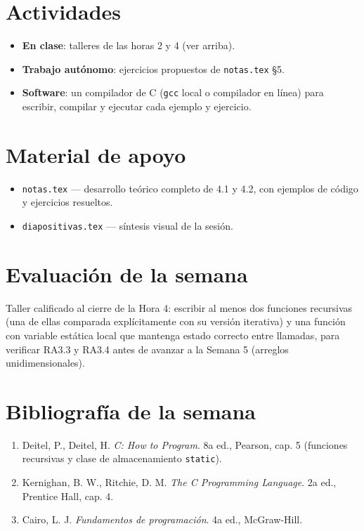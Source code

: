 \documentclass[11pt,letterpaper]{article}
\begin{document}
\section{Actividades}

\begin{itemize}[leftmargin=1.2cm]
  \item \textbf{En clase}: talleres de las horas 2 y 4 (ver arriba).
  \item \textbf{Trabajo autónomo}: ejercicios propuestos de \texttt{notas.tex} §5.
  \item \textbf{Software}: un compilador de C (\texttt{gcc} local o compilador en línea) para
        escribir, compilar y ejecutar cada ejemplo y ejercicio.
\end{itemize}

\section{Material de apoyo}

\begin{itemize}[leftmargin=1.2cm]
  \item \texttt{notas.tex} --- desarrollo teórico completo de 4.1 y 4.2, con ejemplos de código y
        ejercicios resueltos.
  \item \texttt{diapositivas.tex} --- síntesis visual de la sesión.
\end{itemize}

\section{Evaluación de la semana}

Taller calificado al cierre de la Hora 4: escribir al menos dos funciones recursivas (una de ellas
comparada explícitamente con su versión iterativa) y una función con variable estática local que
mantenga estado correcto entre llamadas, para verificar RA3.3 y RA3.4 antes de avanzar a la Semana
5 (arreglos unidimensionales).

\section{Bibliografía de la semana}

\begin{enumerate}[leftmargin=1.2cm]
  \item Deitel, P., Deitel, H. \emph{C: How to Program}. 8a ed., Pearson, cap. 5 (funciones
        recursivas y clase de almacenamiento \texttt{static}).
  \item Kernighan, B. W., Ritchie, D. M. \emph{The C Programming Language}. 2a ed., Prentice Hall,
        cap. 4.
  \item Cairo, L. J. \emph{Fundamentos de programación}. 4a ed., McGraw-Hill.
\end{enumerate}
\end{document}
